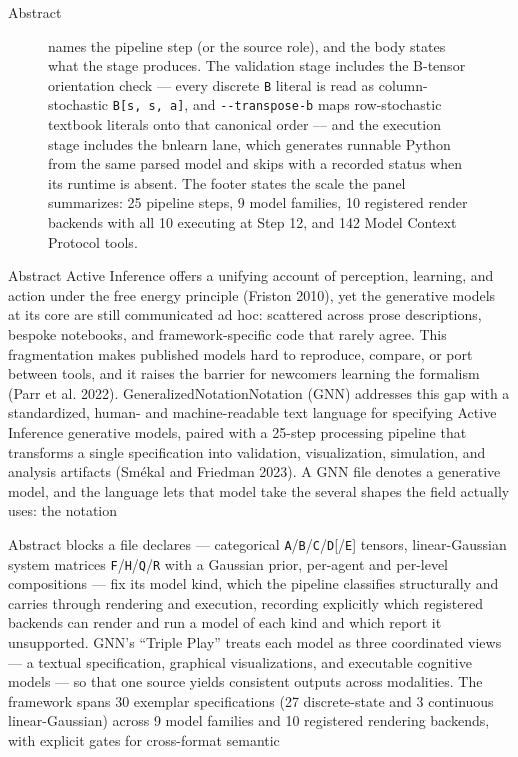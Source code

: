 \documentclass[
  ignorenonframetext,
]{beamer}
\begin{document}
\begin{frame}{Abstract}
\begin{figure}
{names the pipeline step (or the source role), and the body states what
the stage produces. The validation stage includes the B-tensor
orientation check --- every discrete \protect\texttt{B} literal is read
as column-stochastic
\protect\texttt{B{[}s\textquotesingle{},\ s,\ a{]}}, and
\protect\texttt{-\/-transpose-b} maps row-stochastic textbook literals
onto that canonical order --- and the execution stage includes the
bnlearn lane, which generates runnable Python from the same parsed model
and skips with a recorded status when its runtime is absent. The footer
states the scale the panel summarizes: 25 pipeline steps, 9 model
families, 10 registered render backends with all 10 executing at Step
12, and 142 Model Context Protocol tools.}\label{fig:graphical_abstract}
\end{figure}

\end{frame}

\begin{frame}{Abstract}
Active Inference offers a unifying account of perception, learning, and
action under the free energy principle (Friston 2010), yet the
generative models at its core are still communicated ad hoc: scattered
across prose descriptions, bespoke notebooks, and framework-specific
code that rarely agree. This fragmentation makes published models hard
to reproduce, compare, or port between tools, and it raises the barrier
for newcomers learning the formalism (Parr et al. 2022).
GeneralizedNotationNotation (GNN) addresses this gap with a
standardized, human- and machine-readable text language for specifying
Active Inference generative models, paired with a 25-step processing
pipeline that transforms a single specification into validation,
visualization, simulation, and analysis artifacts (Smékal and Friedman
2023). A GNN file denotes a generative model, and the language lets that
model take the several shapes the field actually uses: the notation
\end{frame}

\begin{frame}{Abstract}
blocks a file declares --- categorical
\texttt{A}/\texttt{B}/\texttt{C}/\texttt{D}{[}/\texttt{E}{]} tensors,
linear-Gaussian system matrices
\texttt{F}/\texttt{H}/\texttt{Q}/\texttt{R} with a Gaussian prior,
per-agent and per-level compositions --- fix its model kind, which the
pipeline classifies structurally and carries through rendering and
execution, recording explicitly which registered backends can render and
run a model of each kind and which report it unsupported. GNN's ``Triple
Play'' treats each model as three coordinated views --- a textual
specification, graphical visualizations, and executable cognitive models
--- so that one source yields consistent outputs across modalities. The
framework spans 30 exemplar specifications (27 discrete-state and 3
continuous linear-Gaussian) across 9 model families and 10 registered
rendering backends, with explicit gates for cross-format semantic
\end{frame}
\end{document}
